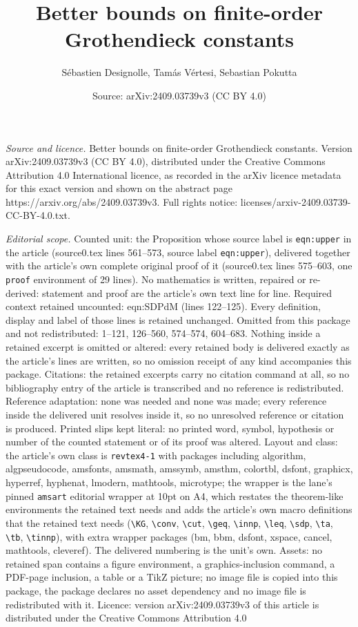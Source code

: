\documentclass[10pt,a4paper]{amsart}
\title[Better bounds on finite-order Grothendieck constants]{Better bounds on finite-order Grothendieck constants}
\author{S\'ebastien Designolle, Tam\'as V\'ertesi, Sebastian Pokutta}
\date{Source: arXiv:2409.03739v3 (CC BY 4.0)}
\begin{document}
\maketitle

\noindent\emph{Source and licence.} Better bounds on finite-order Grothendieck constants. Version arXiv:2409.03739v3 (CC BY 4.0), distributed under the Creative Commons Attribution 4.0 International licence, as recorded in the arXiv licence metadata for this exact version and shown on the abstract page https://arxiv.org/abs/2409.03739v3. Full rights notice: licenses/arxiv-2409.03739-CC-BY-4.0.txt.\par\smallskip

\noindent\textit{Editorial scope.} Counted unit: the Proposition whose source label is \texttt{eqn:upper} in the article (source0.tex lines 561--573, source label \texttt{eqn:upper}), delivered together with the article's own complete original proof of it (source0.tex lines 575--603, one \texttt{proof} environment of 29 lines). No mathematics is written, repaired or re-derived: statement and proof are the article's own text line for line. Required context retained uncounted: eqn:SDPdM (lines 122--125). Every definition, display and label of those lines is retained unchanged. Omitted from this package and not redistributed: 1--121, 126--560, 574--574, 604--683. Nothing inside a retained excerpt is omitted or altered: every retained body is delivered exactly as the article's lines are written, so no omission receipt of any kind accompanies this package. Citations: the retained excerpts carry no citation command at all, so no bibliography entry of the article is transcribed and no reference is redistributed. Reference adaptation: none was needed and none was made; every reference inside the delivered unit resolves inside it, so no unresolved reference or citation is produced. Printed slips kept literal: no printed word, symbol, hypothesis or number of the counted statement or of its proof was altered. Layout and class: the article's own class is \texttt{revtex4-1} with packages including algorithm, algpseudocode, amsfonts, amsmath, amssymb, amsthm, colortbl, dsfont, graphicx, hyperref, hyphenat, lmodern, mathtools, microtype; the wrapper is the lane's pinned \texttt{amsart} editorial wrapper at 10pt on A4, which restates the theorem-like environments the retained text needs and adds the article's own macro definitions that the retained text needs (\texttt{\textbackslash KG}, \texttt{\textbackslash conv}, \texttt{\textbackslash cut}, \texttt{\textbackslash geq}, \texttt{\textbackslash innp}, \texttt{\textbackslash leq}, \texttt{\textbackslash sdp}, \texttt{\textbackslash ta}, \texttt{\textbackslash tb}, \texttt{\textbackslash tinnp}), with extra wrapper packages (bm, bbm, dsfont, xspace, cancel, mathtools, cleveref). The delivered numbering is the unit's own. Assets: no retained span contains a figure environment, a graphics-inclusion command, a PDF-page inclusion, a table or a TikZ picture; no image file is copied into this package, the package declares no asset dependency and no image file is redistributed with it. Licence: version arXiv:2409.03739v3 of this article is distributed under the Creative Commons Attribution 4.0 
\end{document}
